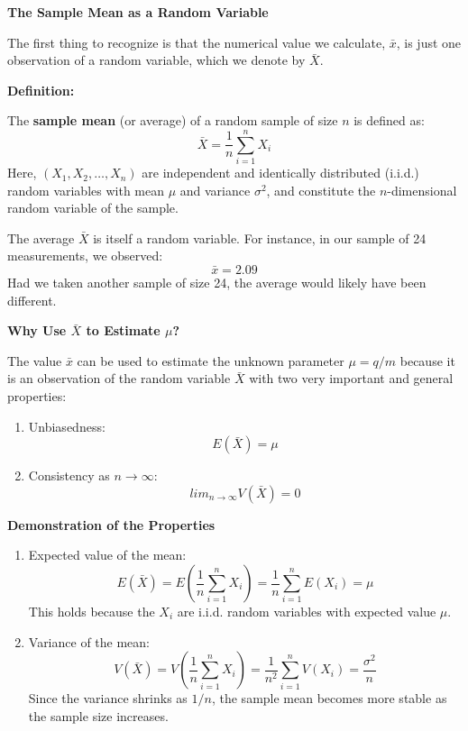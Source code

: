 \documentclass[
]{book}
\begin{document}
\textbf{The Sample Mean as a Random Variable}

The first thing to recognize is that the numerical value we calculate, \(\bar{x}\), is just one observation of a random variable, which we denote by \(\bar{X}\).

\textbf{Definition:}

The \textbf{sample mean} (or average) of a random sample of size \(n\) is defined as:
\[
\bar{X} = \frac{1}{n} \sum_{i=1}^n X_i
\]
Here, \((X_1, X_2, \dots, X_n)\) are independent and identically distributed (i.i.d.) random variables with mean \(\mu\) and variance \(\sigma^2\), and constitute the \(n\)-dimensional random variable of the sample.

The average \(\bar{X}\) is itself a random variable. For instance, in our sample of 24 measurements, we observed:
\[
\bar{x} = 2.09
\]
Had we taken another sample of size 24, the average would likely have been different.

\textbf{Why Use \(\bar{X}\) to Estimate \(\mu\)?}

The value \(\bar{x}\) can be used to estimate the unknown parameter \(\mu = q/m\) because it is an observation of the random variable \(\bar{X}\) with two very important and general properties:

\begin{enumerate}
\def\labelenumi{\arabic{enumi}.}
\item
  Unbiasedness:\\
  \[
  E(\bar{X}) = \mu
  \]
\item
  Consistency as \(n \to \infty\):\\
  \[
  lim_{n \to \infty} V(\bar{X}) = 0
  \]
\end{enumerate}

\textbf{Demonstration of the Properties}

\begin{enumerate}
\def\labelenumi{\arabic{enumi}.}
\item
  Expected value of the mean:
  \[
  E(\bar{X}) = E\left(\frac{1}{n} \sum_{i=1}^n X_i\right) = \frac{1}{n} \sum_{i=1}^n E(X_i) = \mu
  \]
  This holds because the \(X_i\) are i.i.d. random variables with expected value \(\mu\).
\item
  Variance of the mean:
  \[
  V(\bar{X}) = V\left(\frac{1}{n} \sum_{i=1}^n X_i\right) = \frac{1}{n^2} \sum_{i=1}^n V(X_i) = \frac{\sigma^2}{n}
  \]
  Since the variance shrinks as \(1/n\), the sample mean becomes more stable as the sample size increases.
\end{enumerate}
\end{document}
